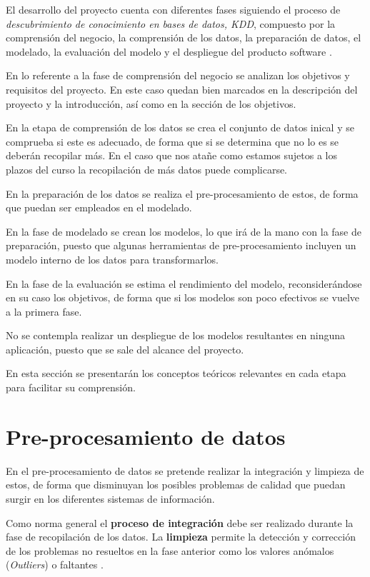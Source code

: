 El desarrollo del proyecto cuenta con diferentes fases siguiendo el proceso de \textit{descubrimiento de conocimiento
en bases de datos, KDD}, compuesto por la comprensión del negocio, la comprensión de los datos, la preparación de datos,
el modelado, la evaluación del modelo y el despliegue del producto software \cite{book:witten2017}.


En lo referente a la fase de comprensión del negocio se analizan los objetivos y requisitos del proyecto. 
En este caso quedan bien marcados en la descripción del proyecto y la introducción, así como en la sección de los objetivos.

En la etapa de comprensión de los datos se crea el conjunto de datos inical y se comprueba si este es adecuado,
de forma que si se determina que no lo es se deberán recopilar más.
En el caso que nos atañe como estamos sujetos a los plazos del curso la recopilación de más datos puede complicarse.

En la preparación de los datos se realiza el pre-procesamiento de estos, de forma que puedan ser empleados en el modelado.

En la fase de modelado se crean los modelos, lo que irá de la mano con la fase de preparación, puesto que algunas herramientas de 
pre-procesamiento incluyen un modelo interno de los datos para transformarlos.

En la fase de la evaluación se estima el rendimiento del modelo, reconsiderándose en su caso los objetivos, de forma que si los modelos son poco efectivos
se vuelve a la primera fase.

No se contempla realizar un despliegue de los modelos resultantes en ninguna aplicación, puesto que se sale del alcance del proyecto.

En esta sección se presentarán los conceptos teóricos relevantes en cada etapa para facilitar su comprensión.

\section{Pre-procesamiento de datos}
En el pre-procesamiento de datos se pretende realizar la integración y limpieza de estos, de forma que disminuyan los posibles problemas
de calidad que puedan surgir en los diferentes sistemas de información.

Como norma general el \textbf{proceso de integración} debe ser realizado durante la fase de recopilación de los datos.
La \textbf{limpieza} permite la detección y corrección de los problemas no resueltos en la fase anterior como los valores anómalos (\textit{Outliers}) o faltantes 
\cite{book:hernandez2004}.  

